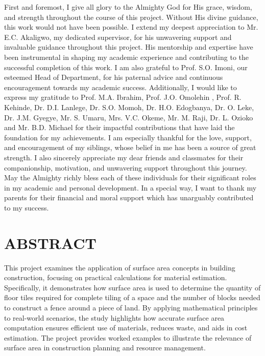 \documentclass[12pt,a4paper,openany,titlepage,reqno, final]{report}
\theoremstyle{definition}
\begin{document}
		First and foremost, I give all glory to the Almighty God for His grace, wisdom, and strength throughout the course of this project. Without His divine guidance, this work would not have been possible. I extend my deepest appreciation to Mr. E.C. Akaligwo, my dedicated supervisor, for his unwavering support and invaluable guidance throughout this project. His mentorship and expertise have been instrumental in shaping my academic experience and contributing to the successful completion of this work. I am also grateful to Prof. S.O. Imoni, our esteemed Head of Department, for his paternal advice and continuous encouragement towards my academic success. Additionally, I would like to express my gratitude to Prof. M.A. Ibrahim, Prof. J.O. Omolehin , Prof. R. Kehinde, Dr. D.I. Lanlege, Dr. S.O. Momoh, Dr. H.O. Edogbanya, Dr. O. Leke, Dr. J.M. Gyegye, Mr. S. Umaru, Mrs. V.C. Okeme, Mr. M. Raji, Dr. L. Ozioko and Mr. B.D. Michael for their impactful contributions that have laid the foundation for my achievements. I am especially thankful for the love, support, and encouragement of my siblings, whose belief in me has been a source of great strength. I also sincerely appreciate my dear friends and classmates for their companionship, motivation, and unwavering support throughout this journey. May the Almighty richly bless each of these individuals for their significant roles in my academic and personal development. In a special way, I want to thank my parents for their financial and moral support which has unarguably contributed to my success.
	
	
	\chapter*{ABSTRACT}
	
		This project examines the application of surface area concepts in building construction, focusing on practical calculations for material estimation. Specifically, it demonstrates how surface area is used to determine the quantity of floor tiles required for complete tiling of a space and the number of blocks needed to construct a fence around a piece of land. By applying mathematical principles to real-world scenarios, the study highlights how accurate surface area computation ensures efficient use of materials, reduces waste, and aids in cost estimation. The project provides worked examples to illustrate the relevance of surface area in construction planning and resource management.
\end{document}
